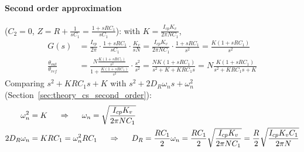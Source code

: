 \begin{enumerate}
\paragraph{Second order approximation} (\(C_2 = 0\), \(Z = R + \frac{1}{sC_1} = \frac{1 + sRC_1}{sC_1}\)): with
\(K = \frac{I_{cp} K_v}{2\pi N C_1}\),
\begin{align*}
  G(s) &= \frac{I_{cp}}{2\pi}\cdot\frac{1 + sRC_1}{sC_1}\cdot\frac{K_v}{sN} = \frac{I_{cp} K_v}{2\pi N C_1}\cdot\frac{1 + sRC_1}{s^2} = \frac{K(1 + sRC_1)}{s^2} \\
  \frac{\theta_{out}}{\theta_{ref}} &= \frac{N\frac{K(1 + sRC_1)}{s^2}}{1 + \frac{K(1 + sRC_1)}{s^2}} \cdot \frac{s^2}{s^2}
  = \frac{NK(1 + sRC_1)}{s^2 + K + KRC_1 s} = N\frac{K(1 + sRC_1)}{s^2 + K RC_1 s + K} \tag{1}
\end{align*}
Comparing \(s^2 + KRC_1 s + K\) with \(s^2 + 2D_R\omega_n s + \omega_n^2\)
(Section~\ref{sec:theory_cs_second_order}):
\begin{align*}
  \omega_n^2 &= K \hspace{0.5cm} \Rightarrow \hspace{0.5cm} \omega_n = \sqrt{\frac{I_{cp} K_v}{2\pi N C_1}} \\
  2D_R\omega_n &= KRC_1 = \omega_n^2 RC_1 \hspace{0.5cm} \Rightarrow \hspace{0.5cm}
  D_R = \frac{RC_1}{2}\omega_n = \frac{RC_1}{2}\sqrt{\frac{I_{cp} K_v}{2\pi N C_1}} = \frac{R}{2}\sqrt{\frac{I_{cp} K_v C_1}{2\pi N}}
\end{align*}
\end{enumerate}

